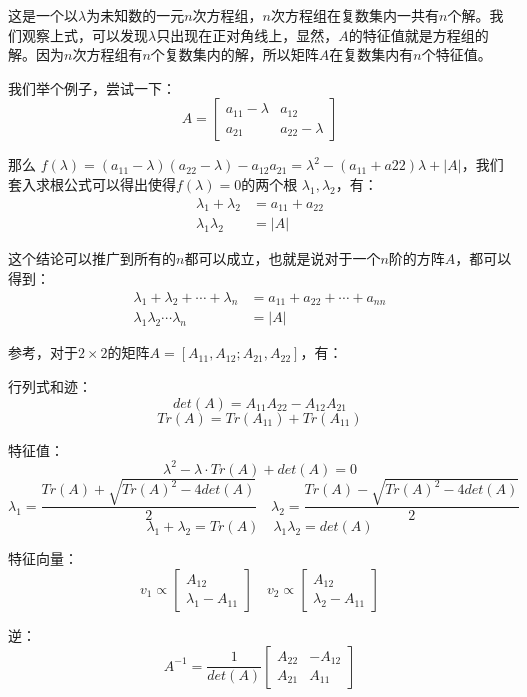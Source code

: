 \documentclass[12pt]{article}
\begin{document}
这是一个以$\lambda$为未知数的一元$n$次方程组，$n$次方程组在复数集内一共有$n$个解。我们观察上式，可以发现$\lambda$只出现在正对角线上，显然，$A$的特征值就是方程组的解。因为$n$次方程组有$n$个复数集内的解，所以矩阵$A$在复数集内有$n$个特征值。

我们举个例子，尝试一下：
$$
A = 
\begin{bmatrix}
a_{11} - \lambda & a_{12} \\
a_{21} & a_{22} - \lambda
\end{bmatrix}
$$

那么 $f(\lambda) = (a_{11}-\lambda)(a_{22}-\lambda) - a_{12}a_{21} = \lambda^2 - (a_{11}+a{22})\lambda + |A|$，我们套入求根公式可以得出使得$f(\lambda)=0$的两个根 $\lambda_1, \lambda_2$，有：
\begin{align*}
    \lambda_1 + \lambda_2 &= a_{11} + a_{22} \\
    \lambda_1\lambda_2 &= |A|
\end{align*}

这个结论可以推广到所有的$n$都可以成立，也就是说对于一个$n$阶的方阵$A$，都可以得到：
\begin{align*}
    \lambda_1 + \lambda_2 + \cdots + \lambda_n &= a_{11} + a_{22} + \cdots + a_{nn} \\
    \lambda_1\lambda_2\cdots\lambda_n &= |A|
\end{align*}

\begin{framed}  
\small{
参考\cite{The_Matrix_Cookbook}，对于$2\times 2$的矩阵$A = [A_{11}, A_{12};A_{21}, A_{22}]$，有：

行列式和迹：
$$
det(A) = A_{11}A_{22} - A_{12}A_{21}
$$
$$
Tr(A) = Tr(A_{11}) + Tr(A_{11}) 
$$

特征值：
$$
\lambda^2 - \lambda \cdot Tr(A) + det(A) = 0    
$$
$$
\lambda_1 = \frac{Tr(A)+\sqrt{Tr(A)^2 - 4det(A)}}{2} \quad
\lambda_2 = \frac{Tr(A)-\sqrt{Tr(A)^2 - 4det(A)}}{2}
$$
$$
\lambda_1 + \lambda_2 = Tr(A) \quad \lambda_1\lambda_2 = det(A)
$$

特征向量：
$$
v_1 \propto \begin{bmatrix}
A_{12} \\ \lambda_1 - A_{11}
\end{bmatrix}
\quad
v_2 \propto \begin{bmatrix}
A_{12} \\ \lambda_2 - A_{11}
\end{bmatrix}
$$

逆：
$$
A^{-1} = \frac{1}{det(A)}\begin{bmatrix}
A_{22} & -A_{12} \\
A_{21} & A_{11}
\end{bmatrix}
$$
}
\end{framed}
\end{document}
